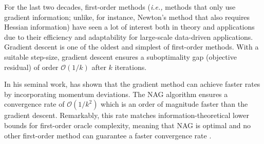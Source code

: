 \documentclass{article}
\theoremstyle{plain}
\theoremstyle{definition}
\theoremstyle{remark}
\begin{document}
For the last two decades, first-order methods (\emph{i.e.,} methods that only use gradient information; unlike, for instance, Newton’s method that also requires Hessian information) have seen a lot of interest both in theory and applications due to their efficiency and adaptability for large-scale data-driven applications. Gradient descent is one of the oldest and simplest of first-order methods. With a suitable step-size, gradient descent ensures a suboptimality gap (objective residual) of order $\mathcal{O}(1/k)$ after $k$ iterations. 

In his seminal work, \citet{Nesterov1983AMF} has shown that the gradient method can achieve faster rates by incorporating momentum deviations. The NAG algorithm ensures a convergence rate of $\mathcal O (1/k^2)$ which is an order of magnitude faster than the gradient descent. Remarkably, this rate matches information-theoretical lower bounds for first-order oracle complexity, meaning that NAG is optimal and no other first-order method can guarantee a faster convergence rate \citep{nesterov2003introductory}. 
\end{document}
